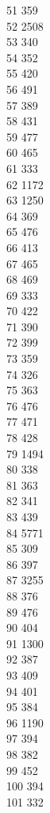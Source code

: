 { 51	359 \\
 52	2508 \\
 53	340 \\
 54	352 \\
 55	420 \\
 56	491 \\
 57	389 \\
 58	431 \\
 59	477 \\
 60	465 \\
 61	333 \\
 62	1172 \\
 63	1250 \\
 64	369 \\
 65	476 \\
 66	413 \\
 67	465 \\
 68	469 \\
 69	333 \\
 70	422 \\
 71	390 \\
 72	399 \\
 73	359 \\
 74	326 \\
 75	363 \\
 76	476 \\
 77	471 \\
 78	428 \\
 79	1494 \\
 80	338 \\
 81	363 \\
 82	341 \\
 83	439 \\
 84	5771 \\
 85	309 \\
 86	397 \\
 87	3255 \\
 88	376 \\
 89	476 \\
 90	404 \\
 91	1300 \\
 92	387 \\
 93	409 \\
 94	401 \\
 95	384 \\
 96	1190 \\
 97	394 \\
 98	382 \\
 99	452 \\
 100	394 \\
 101	332 \\
}
